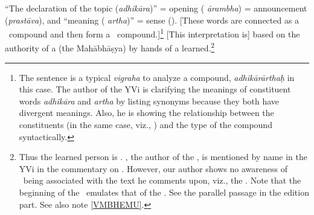 %
``The declaration of the topic (\emph{adhikāra})'' = opening (\emph{%
ārambha}) = announcement (\emph{prastāva}), and ``meaning (\emph{%
artha})'' = sense (\abhidheya).  [These words are connected as
a \KD\ compound and then form a \BV\ compound.]\footnote{The sentence is a typical \emph{vigraha\/} to analyze a compound, \emph{adhikārārthaḥ} in this case.  The author of the YVi is clarifying the meanings of constituent words \emph{adhikāra\/} and \emph{artha} by listing synonyms because they both have divergent meanings.  Also, he is showing the relationship between the constituents (in the same case, viz., \KD) and the type of the compound syntactically.}  [This interpretation is]
based on the authority of a \smrti\/ (the Mahābhāṣya) by hands of a learned.\footnote{\label{PTJME}Thus the learned person is \Patanjali.  \Patanjali, the author of the \VMBh, is mentioned by name in the YVi in the commentary on  \citep[299]{yvi}.  However, our author shows no awareness of \Patanjali\ being associated with the text he comments upon, viz., the \PYS.  Note that the beginning of the \PYS\ emulates that of the \VMBh.  See the parallel passage in the edition part.  See also note \ref{VMBHEMU}.}%
  

